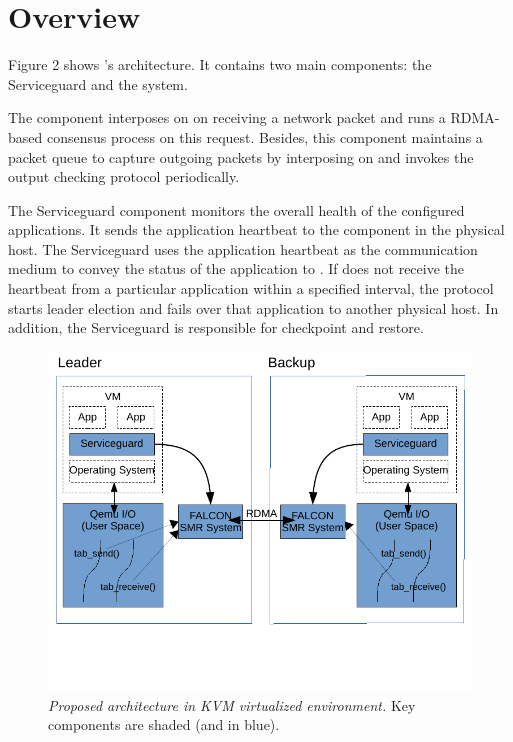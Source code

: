 \section{\xxx Overview} \label{sec:overview}

Figure 2 shows \xxx's architecture. It contains two main components: 
the Serviceguard and the \smrsystem \smr system.

The \smrsystem component interposes on \tapsend on receiving a network packet 
and runs a RDMA-based consensus process on this request. Besides, this component 
maintains a packet queue to capture outgoing packets by interposing on 
\taprecv and invokes the output checking protocol periodically. 

The Serviceguard component monitors the overall health of the configured applications. 
It sends the application heartbeat to the \smrsystem component in the physical 
host. The Serviceguard uses the application heartbeat as the communication 
medium to convey the status of the application to \smrsystem. If \smrsystem does not 
receive the heartbeat from a particular application within a specified interval, 
the protocol starts leader election and fails over that application to another physical 
host. In addition, the Serviceguard is responsible for checkpoint and restore. 

\begin{figure}[t]
\centering
\includegraphics[width=.47\textwidth]{figures/arch}
\vspace{-.2in}
\caption{{\em Proposed architecture in KVM virtualized environment.} Key components are shaded (and
in blue).} \label{fig:arc}
\vspace{.05in}
\end{figure}

